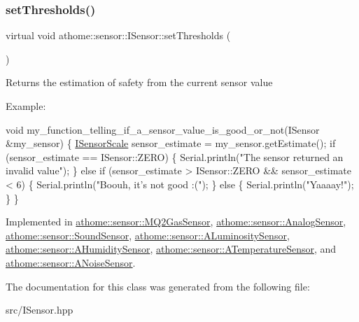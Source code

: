\subsubsection{\texorpdfstring{set\+Thresholds()}{setThresholds()}}
{\footnotesize\ttfamily virtual void athome\+::sensor\+::\+I\+Sensor\+::set\+Thresholds (\begin{DoxyParamCaption}\item[{const \mbox{\hyperlink{structathome_1_1sensor_1_1_i_sensor_1_1_i_sensor_thresholds}{I\+Sensor\+Thresholds}} \&}]{ }\end{DoxyParamCaption})\hspace{0.3cm}{\ttfamily [pure virtual]}}

Returns the estimation of safety from the current sensor value

Example\+:


\begin{DoxyCode}
\textcolor{keywordtype}{void} my\_function\_telling\_if\_a\_sensor\_value\_is\_good\_or\_not(ISensor &my\_sensor) \{
  \mbox{\hyperlink{classathome_1_1sensor_1_1_i_sensor_aa70bc27a4c17c86caf96cca776541ddf}{ISensorScale}} sensor\_estimate = my\_sensor.getEstimate();
  \textcolor{keywordflow}{if} (sensor\_estimate == ISensor::ZERO) \{
    Serial.println(\textcolor{stringliteral}{"The sensor returned an invalid value"});
  \}
  \textcolor{keywordflow}{else} \textcolor{keywordflow}{if} (sensor\_estimate > ISensor::ZERO && sensor\_estimate < 6) \{
    Serial.println(\textcolor{stringliteral}{"Boouh, it's not good :("});
  \}
  \textcolor{keywordflow}{else} \{
    Serial.println(\textcolor{stringliteral}{"Yaaaay!"});
  \}
\}
\end{DoxyCode}
 

Implemented in \mbox{\hyperlink{classathome_1_1sensor_1_1_m_q2_gas_sensor_a69de9f45b9babd2d111b4ce020d7c83e}{athome\+::sensor\+::\+M\+Q2\+Gas\+Sensor}}, \mbox{\hyperlink{classathome_1_1sensor_1_1_analog_sensor_addcdb79aa03b7b6e386bc9c59faced10}{athome\+::sensor\+::\+Analog\+Sensor}}, \mbox{\hyperlink{classathome_1_1sensor_1_1_sound_sensor_adaf42abe0443f486361656efe9587ba7}{athome\+::sensor\+::\+Sound\+Sensor}}, \mbox{\hyperlink{classathome_1_1sensor_1_1_a_luminosity_sensor_aa26ed7176ba600f6900bd249edce71ab}{athome\+::sensor\+::\+A\+Luminosity\+Sensor}}, \mbox{\hyperlink{classathome_1_1sensor_1_1_a_humidity_sensor_a1a19bfee3db6b0940f1329b42d7ed0d0}{athome\+::sensor\+::\+A\+Humidity\+Sensor}}, \mbox{\hyperlink{classathome_1_1sensor_1_1_a_temperature_sensor_a1c323184ac116784e877151895dfd080}{athome\+::sensor\+::\+A\+Temperature\+Sensor}}, and \mbox{\hyperlink{classathome_1_1sensor_1_1_a_noise_sensor_a8429e91e9f8b2e1634a405780f456beb}{athome\+::sensor\+::\+A\+Noise\+Sensor}}.



The documentation for this class was generated from the following file\+:\begin{DoxyCompactItemize}
\item 
src/I\+Sensor.\+hpp\end{DoxyCompactItemize}

